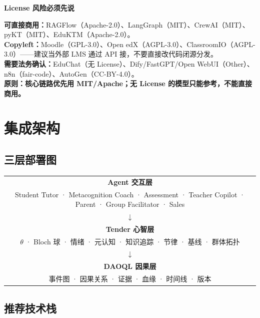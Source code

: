 \documentclass[UTF8,a4paper,11pt]{ctexart}
\newenvironment{explainbox}[1]
{\begin{center}\begin{minipage}{0.94\textwidth}\colorbox{boxbg}{\parbox{0.92\textwidth}{\textbf{#1}\par\vspace{2pt}}}}
{\end{minipage}\end{center}}
\begin{document}
\begin{explainbox}{License 风险必须先说}
\textbf{可直接商用：}RAGFlow（Apache-2.0）、LangGraph（MIT）、CrewAI（MIT）、pyKT（MIT）、EduKTM（Apache-2.0）。\\
\textbf{Copyleft：}Moodle（GPL-3.0）、Open edX（AGPL-3.0）、ClassroomIO（AGPL-3.0）——建议当外部 LMS 通过 API 接，不要直接改代码闭源分发。\\
\textbf{需要法务确认：}EduChat（无 License）、Dify/FastGPT/Open WebUI（Other）、n8n（fair-code）、AutoGen（CC-BY-4.0）。\\
\textbf{原则：核心链路优先用 MIT/Apache；无 License 的模型只能参考，不能直接商用。}
\end{explainbox}

\section{集成架构}

\subsection{三层部署图}

\begin{center}
\begin{longtable}{@{}c@{}}
\toprule
\textbf{Agent 交互层} \\
Student Tutor · Metacognition Coach · Assessment · Teacher Copilot · Parent · Group Facilitator · Sales \\
$\downarrow$ \\
\textbf{Tender 心智层} \\
$\theta$ · Bloch 球 · 情绪 · 元认知 · 知识追踪 · 节律 · 基线 · 群体拓扑 \\
$\downarrow$ \\
\textbf{DAOQL 因果层} \\
事件图 · 因果关系 · 证据 · 血缘 · 时间线 · 版本 \\
\bottomrule
\end{longtable}
\end{center}

\subsection{推荐技术栈}
\end{document}
